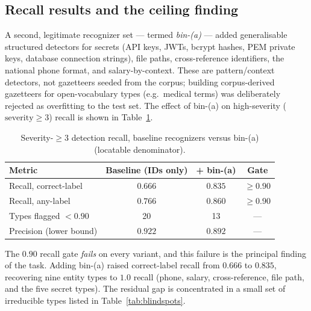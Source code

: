 \documentclass[11pt,a4paper]{article}
\begin{document}
\subsection{Recall results and the ceiling finding}
A second, legitimate recognizer set --- termed \emph{bin-(a)} --- added generalisable structured detectors for secrets (API keys, JWTs, bcrypt hashes, PEM private keys, database connection strings), file paths, cross-reference identifiers, the national phone format, and salary-by-context. These are pattern/context detectors, not gazetteers seeded from the corpus; building corpus-derived gazetteers for open-vocabulary types (e.g.\ medical terms) was deliberately rejected as overfitting to the test set. The effect of bin-(a) on high-severity ($\text{severity}\geq 3$) recall is shown in Table~\ref{tab:presidiorecall}.

\begin{table}[h]
\centering
\caption{Severity-$\geq 3$ detection recall, baseline recognizers versus bin-(a) (locatable denominator).}
\label{tab:presidiorecall}
\begin{tabular}{l c c c}
\toprule
\textbf{Metric} & \textbf{Baseline (IDs only)} & \textbf{+ bin-(a)} & \textbf{Gate} \\
\midrule
Recall, correct-label & $0.666$ & $\mathbf{0.835}$ & $\geq 0.90$ \\
Recall, any-label & $0.766$ & $\mathbf{0.860}$ & $\geq 0.90$ \\
Types flagged $<0.90$ & 20 & 13 & --- \\
Precision (lower bound) & $0.922$ & $0.892$ & --- \\
\bottomrule
\end{tabular}
\end{table}

The $0.90$ recall gate \emph{fails} on every variant, and this failure is the principal finding of the task. Adding bin-(a) raised correct-label recall from $0.666$ to $0.835$, recovering nine entity types to $1.0$ recall (phone, salary, cross-reference, file path, and the five secret types). The residual gap is concentrated in a small set of irreducible types listed in Table~\ref{tab:blindspots}.
\end{document}
